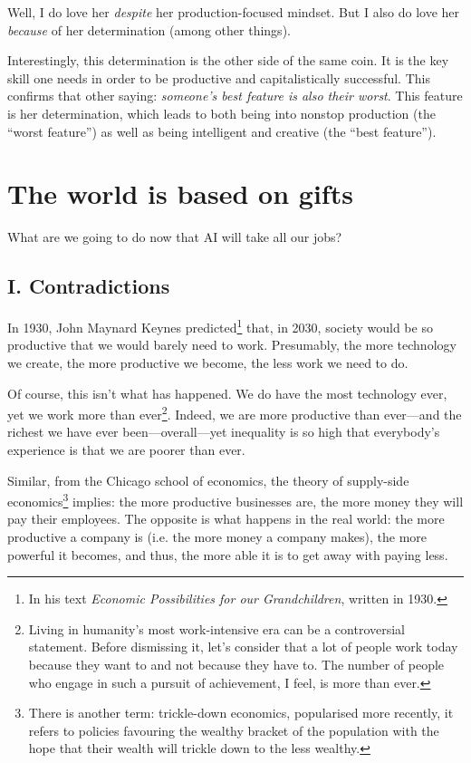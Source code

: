 Well, I do love her \emph{despite} her production-focused mindset. But I also do love her \emph{because} of her determination (among other things).

Interestingly, this determination is the other side of the same coin. It is the key skill one needs in order to be productive and capitalistically successful. This confirms that other saying: \emph{someone’s best feature is also their worst}. This feature is her determination, which leads to both being into nonstop production (the “worst feature”) as well as being intelligent and creative (the “best feature”).

\section{The world is based on gifts}

What are we going to do now that AI will take all our jobs?

\subsection{I. Contradictions}

In 1930, John Maynard Keynes predicted\footnote{In his text \emph{Economic Possibilities for our Grandchildren}, written in 1930.} that, in 2030, society would be so productive that we would barely need to work. Presumably, the more technology we create, the more productive we become, the less work we need to do.

Of course, this isn’t what has happened. We do have the most technology ever, yet we work more than ever\footnote{Living in humanity’s most work-intensive era can be a controversial statement. Before dismissing it, let’s consider that a lot of people work today because they want to and not because they have to. The number of people who engage in such a pursuit of achievement, I feel, is more than ever.}. Indeed, we are more productive than ever—and the richest we have ever been—overall—yet inequality is so high that everybody’s experience is that we are poorer than ever.

Similar, from the Chicago school of economics, the theory of supply-side economics\footnote{There is another term: trickle-down economics, popularised more recently, it refers to policies favouring the wealthy bracket of the population with the hope that their wealth will trickle down to the less wealthy.} implies: the more productive businesses are, the more money they will pay their employees. The opposite is what happens in the real world: the more productive a company is (i.e. the more money a company makes), the more powerful it becomes, and thus, the more able it is to get away with paying less.

